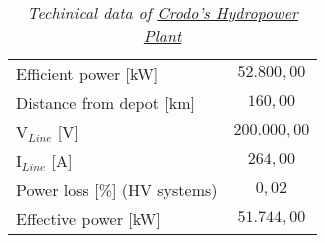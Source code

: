 \begin{table}[h]
\centering
\begin{tabular}{|lc|}
\hline
\rowcolor{bluepoli!40}\multicolumn{2}{|c|}{\textbf{Hydropower Plant - Crodo}}      \\ \hline
\multicolumn{1}{|l|}{Efficient power {[}kW{]}}                      & $52.800,00$  \\ \hline
\multicolumn{1}{|l|}{Distance from depot {[}km{]}}                  & $160,00$     \\ \hline
\multicolumn{1}{|l|}{V$_{Line}$ {[}V{]}}                            & $200.000,00$ \\ \hline
\multicolumn{1}{|l|}{I$_{Line}$ {[}A{]}}                            & $264,00$     \\ \hline
\multicolumn{1}{|l|}{Power loss {[}\%{]} (HV systems)}              & $0,02$       \\ \hline
\multicolumn{1}{|l|}{Effective power {[}kW{]}}                      & $51.744,00$  \\ \hline
\end{tabular}
\caption{\textit{Techinical data of \href{https://goo.gl/maps/dqKiAsYcyXrGMbUd6}{Crodo's Hydropower Plant}}}
\label{tab:crodotechspec}
\end{table}